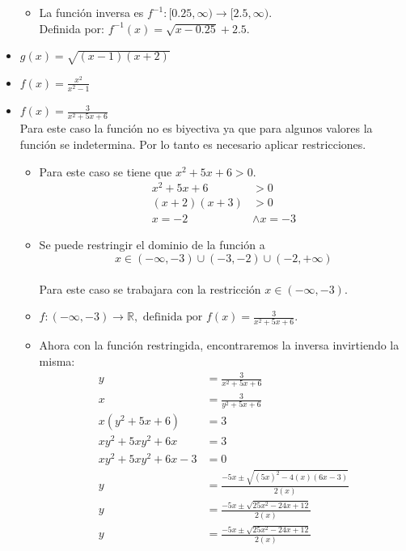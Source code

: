 \documentclass{templateNote}
\begin{document}
\begin{itemize}
\begin{itemize}
        \item La función inversa es $f^{-1}: [0.25, \infty) \rightarrow [2.5, \infty)$. 
        \\Definida por: $f^{-1}(x) = \sqrt{x - 0.25} + 2.5$.
    \end{itemize}
    \item[e)] $g(x) = \sqrt{(x - 1)(x + 2)}$
    \item[f)] $f(x) = \frac{x^2}{x^2 - 1}$
    \item[g)] $f(x) = \frac{3}{x^2 + 5x + 6}$
    \\
    Para este caso la función no es biyectiva ya que para algunos valores la función se indetermina. Por lo tanto es necesario aplicar restricciones.\\
    \begin{itemize}
        \item Para este caso se tiene que $x^2 + 5x + 6 > 0$.
        \begin{align*}
            x^2 + 5x + 6 &> 0 \\
            (x + 2)(x + 3) &> 0 \\
            x = -2 &\wedge x=-3 
        \end{align*}
        \item Se puede restringir el dominio de la función a \\ \[x \in (-\infty, -3) \cup (-3,-2) \cup (-2, +\infty) \] \\Para este caso se trabajara con la restricción $x \in (-\infty, -3)$.
        \item $f:(-\infty, -3) \rightarrow \mathbb{R}, \text{ definida por } f(x) = \frac{3}{x^2 + 5x + 6}$.
        \item Ahora con la función restringida, encontraremos la inversa invirtiendo la misma:
        \begin{align*}
            y &= \frac{3}{x^2 + 5x + 6} \\
            x &= \frac{3}{y^2+5x+6} \\
            x(y^2+5x+6) &= 3 \\
            xy^2 + 5xy^2 + 6x &= 3 \\
            xy^2 + 5xy^2 + 6x - 3 &= 0 \\
            y &= \frac{-5x \pm \sqrt{(5x)^2 - 4(x)(6x - 3)}}{2(x)} \\
            y &= \frac{-5x \pm \sqrt{25x^2 - 24x + 12}}{2(x)} \\
            y &= \frac{-5x \pm \sqrt{25x^2 - 24x + 12}}{2(x)} \\

\end{align*}
\end{itemize}
\end{itemize}
\end{document}

